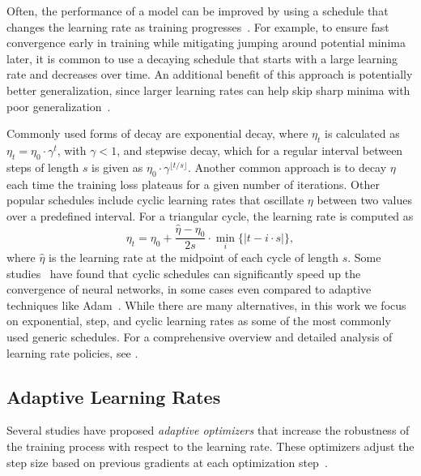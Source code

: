 \documentclass{article} %
\begin{document}
Often, the performance of a model can be improved by using a schedule that changes the learning rate as training progresses~\citep{wuDemystifyingLearningRate2019b}.
For example, to ensure fast convergence early in training while mitigating jumping around potential minima later, it is common to use a decaying schedule that starts with a large learning rate and decreases over time.
An additional benefit of this approach is potentially better generalization, since larger learning rates can help skip sharp minima with poor generalization~\citep{hochreiterFlatMinima1997,chaudhariEntropySGDBiasingGradient2017}.

Commonly used forms of decay are exponential decay, where $\eta_{t}$ is calculated as
$\eta_{t} = \eta_0 \cdot \gamma^t$,
with $\gamma < 1$, and stepwise decay, which for a regular interval between steps of length $s$ is given as $\eta_0 \cdot \gamma^{\lfloor t/s \rfloor}$.
Another common approach is to decay $\eta$ each time the training loss plateaus for a given number of iterations. Other popular schedules include cyclic learning rates that oscillate $\eta$ between two values over a predefined interval.
For a triangular cycle, the learning rate is computed as
\begin{equation}
   \eta_t = \eta_0 + \frac{\hat{\eta} - \eta_0}{2s} \cdot \min_{i} \{|t-i\cdot s|\},
\end{equation}
where $\hat{\eta}$ is the learning rate at the midpoint of each cycle of length $s$.
Some studies~\citep{smithCyclicalLearningRates2017, smithSuperConvergenceVeryFast2018a} have found that cyclic schedules can significantly speed up the convergence of neural networks, in some cases even compared to adaptive techniques like Adam~\citep{kingmaAdamMethodStochastic2017b}.
While there are many alternatives, in this work we focus on exponential, step, and cyclic learning rates as some of the most commonly used generic schedules.
For a comprehensive overview and detailed analysis of learning rate policies, see \citet{wuDemystifyingLearningRate2019b}.

\subsection{Adaptive Learning Rates}

Several studies have proposed \textit{adaptive optimizers} that increase the robustness of the training process with respect to the learning rate.
These optimizers adjust the step size based on previous gradients at each optimization step~\citep{duchiAdaptiveSubgradientMethods2011}.
\end{document}
